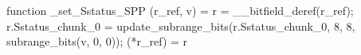 function _set_Sstatus_SPP (r_ref, v) = {
    r = __bitfield_deref(r_ref);
    r.Sstatus_chunk_0 = update_subrange_bits(r.Sstatus_chunk_0, 8, 8, subrange_bits(v, 0, 0));
    (*r_ref) = r
}
